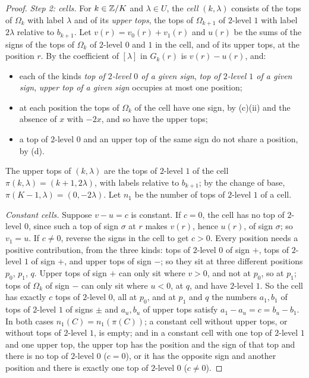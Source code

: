 \begin{proof}
\emph{Step 2: cells.} For $k\in\mathbb{Z}/K$ and $\lambda\in U$, the \emph{cell}
$(k,\lambda)$ consists of the tops of $\Omega_{k}$ with label $\lambda$ and of
its \emph{upper tops}, the tops of $\Omega_{k+1}$ of $2$-level $1$ with label
$2\lambda$ relative to $b_{k+1}$. Let $v(r)=v_{0}(r)+v_{1}(r)$ and $u(r)$ be
the sums of the signs of the tops of $\Omega_{k}$ of $2$-level $0$ and $1$ in
the cell, and of its upper tops, at the position $r$. By 
the coefficient of $[\lambda]$ in $G_{k}(r)$ is $v(r)-u(r)$, and:
\begin{itemize}
\item each of the kinds \emph{top of $2$-level $0$ of a given sign}, \emph{top
of $2$-level $1$ of a given sign}, \emph{upper top of a given sign} occupies
at most one position;
\item at each position the tops of $\Omega_{k}$ of the cell have one sign, by
(c)(ii) and the absence of $x$ with $-2x$, and so have the upper tops;
\item a top of $2$-level $0$ and an upper top of the same sign do not share a
position, by (d).
\end{itemize}
The upper tops of $(k,\lambda)$ are the tops of $2$-level $1$ of the cell
$\pi(k,\lambda)=(k+1,2\lambda)$, with labels relative to $b_{k+1}$; by the
change of base, $\pi(K-1,\lambda)=(0,-2\lambda)$. Let $n_{1}$ be the number of
tops of $2$-level $1$ of a cell.

\emph{Constant cells.} Suppose $v-u=c$ is constant. If $c=0$, the cell has
no top of $2$-level $0$, since such a top of sign $\sigma$ at $r$ makes $v(r)$,
hence $u(r)$, of sign $\sigma$; so $v_{1}=u$. If $c\ne0$, reverse the signs
in the cell to get $c>0$. Every position needs a positive contribution, from
the three kinds: tops of $2$-level $0$ of sign $+$, tops of $2$-level $1$ of
sign $+$, and upper tops of sign $-$; so they sit at three different
positions $p_{0}$, $p_{1}$, $q$. Upper tops of sign $+$ can only sit where
$v>0$, and not at $p_{0}$, so at $p_{1}$; tops of $\Omega_{k}$ of sign $-$
can only sit where $u<0$, at $q$, and have $2$-level $1$. So the cell has
exactly $c$ tops of $2$-level $0$, all at $p_{0}$, and at $p_{1}$ and $q$ the
numbers $a_{1},b_{1}$ of tops of $2$-level $1$ of signs $\pm$ and
$a_{u},b_{u}$ of upper tops satisfy $a_{1}-a_{u}=c=b_{u}-b_{1}$. In both
cases $n_{1}(C)=n_{1}(\pi(C))$; a constant cell without upper tops, or
without tops of $2$-level $1$, is empty; and in a constant cell with one top
of $2$-level $1$ and one upper top, the upper top has the position and the
sign of that top and there is no top of $2$-level $0$ ($c=0$), or it has the
opposite sign and another position and there is exactly one top of $2$-level
$0$ ($c\ne0$).


\end{proof}
